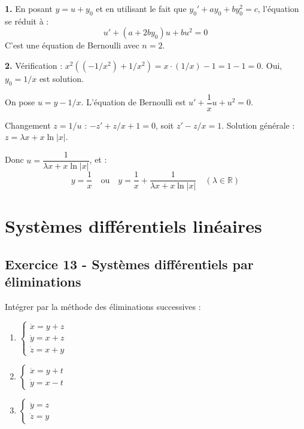 \documentclass[12pt,a4paper]{article}
\begin{document}
\begin{boitecorrige}
\textbf{1.} En posant $y = u + y_0$ et en utilisant le fait que $y_0' + ay_0 + by_0^2 = c$, l'équation se réduit à :
\[
u' + (a + 2b y_0)u + bu^2 = 0
\]
C'est une équation de Bernoulli avec $n=2$.

\textbf{2.} Vérification : $x^2((-1/x^2) + 1/x^2) = x \cdot (1/x) - 1 = 1-1 = 0$. Oui, $y_0 = 1/x$ est solution.

On pose $u = y - 1/x$. L'équation de Bernoulli est $u' + \dfrac{1}{x}u + u^2 = 0$.

Changement $z = 1/u$ : $-z' + z/x + 1 = 0$, soit $z' - z/x = 1$. Solution générale : $z = \lambda x + x\ln|x|$.

Donc $u = \dfrac{1}{\lambda x + x\ln|x|}$, et :
\[
y = \frac{1}{x} \quad \text{ou} \quad y = \frac{1}{x} + \frac{1}{\lambda x + x\ln|x|} \quad (\lambda \in \mathbb{R})
\]
\end{boitecorrige}


\section{Systèmes différentiels linéaires}

\subsection*{Exercice 13 - Systèmes différentiels par éliminations \niveau{\difficile}}

\begin{boiteexercice}
Intégrer par la méthode des éliminations successives :
\begin{enumerate}
  \item $\begin{cases}\dot x = y+z\\\dot y = x+z\\\dot z = x+y\end{cases}$
  \item $\begin{cases}\dot x = y+t\\\dot y = x-t\end{cases}$
  \item $\begin{cases}\ddot y = z\\\ddot z = y\end{cases}$
\end{enumerate}
\end{boiteexercice}
\end{document}
